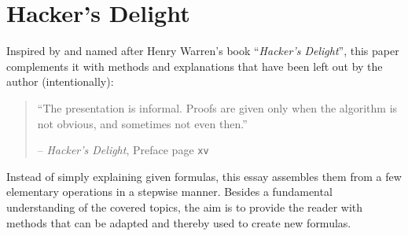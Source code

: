 \section{Hacker's Delight}\label{sec:book}
Inspired by and named after Henry Warren's book ``\emph{Hacker's Delight}''\cite{Warren:2012:HD:2462741},
this paper complements it with methods and explanations that have been left out by the author (intentionally):

\begin{quote}
``The presentation is informal. Proofs are given only when the algorithm is not obvious, and sometimes not even then.''

\hfill -- \emph{Hacker's Delight}, Preface page \texttt{xv} \cite{Warren:2012:HD:2462741}
\end{quote}

Instead of simply explaining given formulas,
this essay assembles them from a few elementary operations in a stepwise manner.
Besides a fundamental understanding of the covered topics,
the aim is to provide the reader with methods that can be adapted and thereby used to create new formulas.
